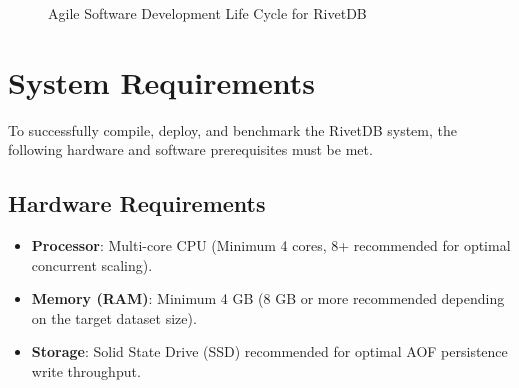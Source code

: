 \begin{figure}[htbp]
    \centering
    \caption{Agile Software Development Life Cycle for RivetDB}
    \label{fig:sdlc_diagram}
\end{figure}

\section{System Requirements}
To successfully compile, deploy, and benchmark the RivetDB system, the following hardware and software prerequisites must be met.

\subsection{Hardware Requirements}
\begin{itemize}[leftmargin=2.5em]
    \item \textbf{Processor}: Multi-core CPU (Minimum 4 cores, 8+ recommended for optimal concurrent scaling).
    \item \textbf{Memory (RAM)}: Minimum 4 GB (8 GB or more recommended depending on the target dataset size).
    \item \textbf{Storage}: Solid State Drive (SSD) recommended for optimal AOF persistence write throughput.
\end{itemize}


